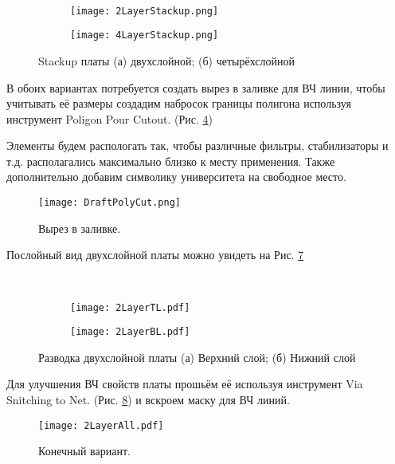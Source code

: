 \begin{figure}[H]
	\centering\
	\begin{subfigure}[b]{\textwidth}
		\centering
		\texttt{[image: 2LayerStackup.png]}
		\caption{}%
		\label{fig:2LayerStackup}
	\end{subfigure}
	\hfill
	\begin{subfigure}[b]{\textwidth}
		\centering
		\texttt{[image: 4LayerStackup.png]}
		\caption{}%
		\label{fig:4LayerStackup}
	\end{subfigure}
	\caption{%
		Stackup платы
		(а) двухслойной;
		(б) четырёхслойной
	}%
	\label{fig:Stackup}
\end{figure}

В обоих вариантах потребуется создать вырез в заливке для ВЧ линии, чтобы учитывать её размеры создадим набросок границы полигона используя инструмент Poligon Pour Cutout. (Рис. \ref{fig:DraftPolyCut})

Элементы будем распологать так, чтобы различные фильтры, стабилизаторы и т.д. располагались максимально близко к месту применения. Также дополнительно добавим символику университета на свободное место.

\begin{figure}[H]
	\centering
	\texttt{[image: DraftPolyCut.png]}
	\caption{Вырез в заливке.}%
	\label{fig:DraftPolyCut}
\end{figure}

Послойный вид двухслойной платы можно увидеть на Рис. \ref{fig:2LayerPCB}

\begin{figure}[H]
	\centering\
	\begin{subfigure}[b]{0.45\textwidth}
		\centering
		\texttt{[image: 2LayerTL.pdf]}
		\caption{}%
		\label{fig:2LayerTL}
	\end{subfigure}
	\hfill
	\begin{subfigure}[b]{0.45\textwidth}
		\centering
		\texttt{[image: 2LayerBL.pdf]}
		\caption{}%
		\label{fig:2LayerBL}
	\end{subfigure}
	\caption{%
		Разводка двухслойной платы
		(а) Верхний слой;
		(б) Нижний слой
	}%
	\label{fig:2LayerPCB}
\end{figure}
 Для улучшения ВЧ свойств платы прошьём её используя инструмент Via Snitching to Net. (Рис. \ref{fig:2LayerAll}) и вскроем маску для ВЧ линий.
 \begin{figure}[H]
 	\centering
 	\texttt{[image: 2LayerAll.pdf]}
 	\caption{Конечный вариант.}%
 	\label{fig:2LayerAll}
 \end{figure}

